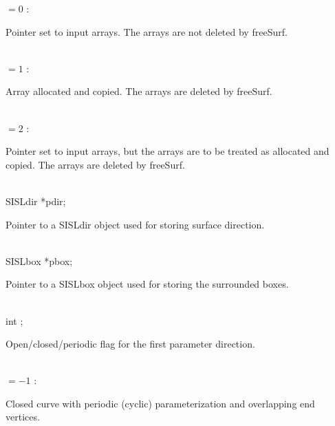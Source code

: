         \>\>\>\>     $= 0$ \>: \begin{minipg5}
                                 Pointer set to input arrays. The
                                arrays are not deleted by freeSurf.
                                \end{minipg5}\\[0.3ex]
        \>\>\>\>     $= 1$ \>: \begin{minipg5}
                                 Array allocated and copied. The
                                arrays are deleted by freeSurf.
                                \end{minipg5}\\[0.3ex]
        \>\>\>\>     $= 2$ \>: \begin{minipg5}
                                Pointer set to input arrays,
                                but the arrays are to be treated
                                as allocated and copied. The
                                arrays are deleted by freeSurf.
                                \end{minipg5}\\[0.8ex]
  \>SISLdir     \>\hspace*{2em}*{\fov pdir}; \>\>\begin{minipg2}
                        Pointer to a SISLdir object used for storing
                        surface direction.
                                \end{minipg2}\\[0.8ex]
  \>SISLbox     \>\hspace*{2em}*{\fov pbox}; \>\>\begin{minipg2}
                        Pointer to a SISLbox object used for storing the surrounded boxes.
                                \end{minipg2}\\[0.8ex]
  \>int         ; \>\>
                \begin{minipg2}
                  Open/closed/periodic flag for the first parameter direction.
                \end{minipg2}\\[0.8ex]
        \>\>\>\>     $=-1$ \>: \begin{minipg5}
                                Closed curve with periodic (cyclic)
                                parameterization and overlapping
                                end vertices.
                                   \end{minipg5}\\[0.8ex]
